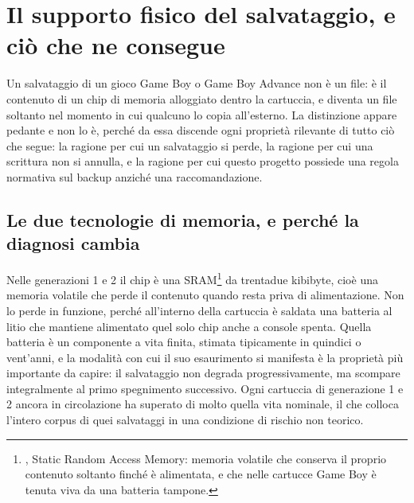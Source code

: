 
\chapter{Il supporto fisico del salvataggio, e ciò che ne consegue}
\label{cap:supporto}

Un salvataggio di un gioco Game Boy o Game Boy Advance non è un file: è il contenuto di un chip di memoria alloggiato dentro la cartuccia, e diventa un file soltanto nel momento in cui qualcuno lo copia all'esterno. La distinzione appare pedante e non lo è, perché da essa discende ogni proprietà rilevante di tutto ciò che segue: la ragione per cui un salvataggio si perde, la ragione per cui una scrittura non si annulla, e la ragione per cui questo progetto possiede una regola normativa sul backup anziché una raccomandazione.

\section{Le due tecnologie di memoria, e perché la diagnosi cambia}

Nelle generazioni 1 e 2 il chip è una SRAM\footnote{, Static Random Access Memory: memoria volatile che conserva il proprio contenuto soltanto finché è alimentata, e che nelle cartucce Game Boy è tenuta viva da una batteria tampone.} da trentadue kibibyte, cioè una memoria volatile che perde il contenuto quando resta priva di alimentazione. Non lo perde in funzione, perché all'interno della cartuccia è saldata una batteria al litio che mantiene alimentato quel solo chip anche a console spenta. Quella batteria è un componente a vita finita, stimata tipicamente in quindici o vent'anni, e la modalità con cui il suo esaurimento si manifesta è la proprietà più importante da capire: il salvataggio non degrada progressivamente, ma scompare integralmente al primo spegnimento successivo. Ogni cartuccia di generazione 1 e 2 ancora in circolazione ha superato di molto quella vita nominale, il che colloca l'intero corpus di quei salvataggi in una condizione di rischio non teorico.

